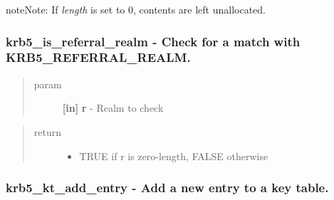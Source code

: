 \documentclass[letterpaper,10pt,english]{sphinxmanual}
\begin{document}
\begin{notice}{note}{Note:}
If \emph{length} is set to 0, contents are left unallocated.
\end{notice}


\subsubsection{krb5\_is\_referral\_realm -  Check for a match with KRB5\_REFERRAL\_REALM.}
\label{appdev/refs/api/krb5_is_referral_realm:krb5-is-referral-realm-check-for-a-match-with-krb5-referral-realm}\label{appdev/refs/api/krb5_is_referral_realm::doc}

\begin{fulllineitems}
\label{appdev/refs/api/krb5_is_referral_realm:c.krb5_is_referral_realm}
\end{fulllineitems}

\begin{quote}\begin{description}
\item[{param}] \leavevmode
\textbf{{[}in{]}} \textbf{r} - Realm to check

\end{description}\end{quote}
\begin{quote}\begin{description}
\item[{return}] \leavevmode\begin{itemize}
\item {} 
TRUE if r is zero-length, FALSE otherwise

\end{itemize}

\end{description}\end{quote}


\subsubsection{krb5\_kt\_add\_entry -  Add a new entry to a key table.}
\label{appdev/refs/api/krb5_kt_add_entry:krb5-kt-add-entry-add-a-new-entry-to-a-key-table}\label{appdev/refs/api/krb5_kt_add_entry::doc}
\end{document}

